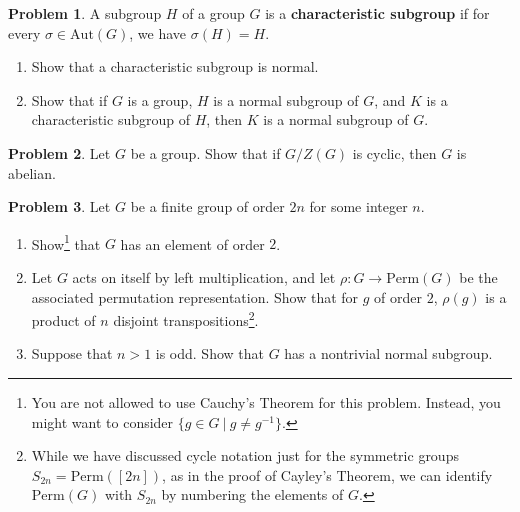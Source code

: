 \documentclass[11pt]{article}
\theoremstyle{definition}
\newtheorem{problem}{Problem}
\begin{document}
      
\smallskip


\begin{problem} A subgroup $H$ of a group $G$ is a \textbf{characteristic subgroup} if for every $\sigma\in \mathrm{Aut}(G)$, we have $\sigma(H) = H$.
\begin{enumerate}[(3.1)]
\item Show that a characteristic subgroup is normal.
\item Show that if $G$ is a group, $H$ is a normal subgroup of $G$, and $K$ is a characteristic subgroup of $H$, then $K$ is a normal subgroup of $G$.
\end{enumerate}
\end{problem}


\smallskip

\begin{problem} Let $G$ be a group. Show that if $G/Z(G)$ is cyclic, then $G$ is abelian.
\end{problem} 



\smallskip

\begin{problem} Let $G$ be a finite group of order $2n$ for some integer $n$.
\begin{enumerate}[(5.1)]
\item Show\footnote{You are not allowed to use Cauchy's Theorem for this problem. Instead, you might want to consider ${\{g\in G \ | \ g \neq g^{-1}\}}$.} that $G$ has an element of order $2$.
\item Let $G$ acts on itself by left multiplication, and let $\rho:G \to \mathrm{Perm}(G)$ be the associated permutation representation. Show that for $g$ of order $2$, $\rho(g)$ is a product of $n$ disjoint transpositions\footnote{While we have discussed cycle notation just for the symmetric groups $S_{2n} = \mathrm{Perm}([2n])$, as in the proof of Cayley's Theorem, we can identify $\mathrm{Perm}(G)$ with $S_{2n}$ by numbering the elements of $G$.}.
\item Suppose that $n>1$ is odd. Show that $G$ has a nontrivial normal subgroup.
\end{enumerate}

\end{problem}
\end{document}
